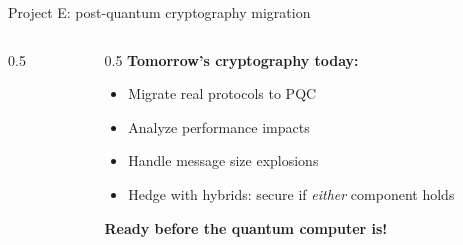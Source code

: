 \ifdefined\PRESENTATION\else\PassOptionsToClass{handout}{beamer}\fi\documentclass[aspectratio=169, lualatex]{beamer}
\begin{document}
\begin{frame}{Project E: post-quantum cryptography migration}
	\begin{columns}[c]
		\begin{column}{0.5\textwidth}
		\end{column}
		\begin{column}{0.5\textwidth}
			\textbf{Tomorrow's cryptography today:}
			\begin{itemize}[<+->]
				\item Migrate real protocols to PQC
				\item Analyze performance impacts
				\item Handle message size explosions
				\item Hedge with hybrids: secure if \emph{either} component holds
			\end{itemize}
			\vspace{0.5cm}
			\textcolor{cipherprimary}{\textbf{Ready before the quantum computer is!}}
		\end{column}
	\end{columns}
\end{frame}
\end{document}
